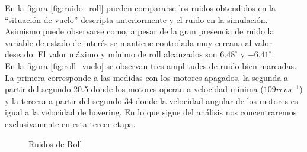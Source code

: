 \documentclass[main]{subfiles}
\begin{document}
En la figura \ref{fig:ruido_roll} pueden compararse los ruidos obtendidos en la ``situaci\'on de vuelo'' descripta anteriormente y el ruido en la simulaci\'on. Asimismo puede observarse como, a pesar de la gran presencia de ruido la variable de estado de inter\'es se mantiene controlada muy cercana al valor deseado. El valor m\'aximo y m\'inimo de roll alcanzados son $6.48^\circ$ y $-6.41^\circ$.\\

En la figura \ref{fig:roll_vuelo} se observan tres amplitudes de ruido bien marcadas. La primera corresponde a las medidas con los motores apagados, la segunda a partir del segundo 20.5 donde los motores operan a velocidad m\'inima ($109 rev s^{-1}$) y la tercera a partir del segundo 34 donde la velocidad angular de los motores es igual a la velocidad de hovering. En lo que sigue del an\'alisis nos concentraremos exclusivamente en esta tercer etapa.\\

\begin{figure}
  \centering
  \caption{Ruidos de Roll}
  \label{fig:ruidos_roll}
\end{figure}
  
\end{document}
